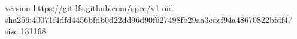 version https://git-lfs.github.com/spec/v1
oid sha256:40071f4dfd4456bfdb0d22dd96d90f627498fb29aa3edcf94a48670822bfdf47
size 131168
